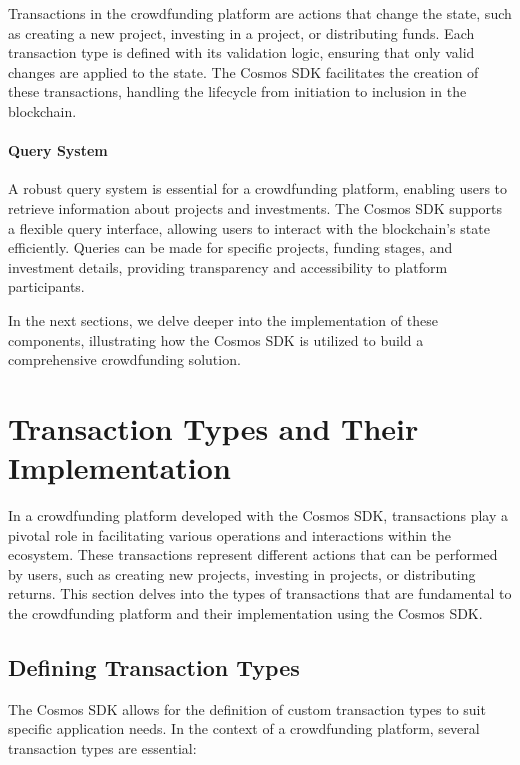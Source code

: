 Transactions in the crowdfunding platform are actions that change the state, such as creating a new project, investing in a project, or distributing funds. Each transaction type is defined with its validation logic, ensuring that only valid changes are applied to the state. The Cosmos SDK facilitates the creation of these transactions, handling the lifecycle from initiation to inclusion in the blockchain.

\paragraph{Query System}

A robust query system is essential for a crowdfunding platform, enabling users to retrieve information about projects and investments. The Cosmos SDK supports a flexible query interface, allowing users to interact with the blockchain's state efficiently. Queries can be made for specific projects, funding stages, and investment details, providing transparency and accessibility to platform participants.

In the next sections, we delve deeper into the implementation of these components, illustrating how the Cosmos SDK is utilized to build a comprehensive crowdfunding solution.

\section{Transaction Types and Their Implementation}

In a crowdfunding platform developed with the Cosmos SDK, transactions play a pivotal role in facilitating various operations and interactions within the ecosystem. These transactions represent different actions that can be performed by users, such as creating new projects, investing in projects, or distributing returns. This section delves into the types of transactions that are fundamental to the crowdfunding platform and their implementation using the Cosmos SDK.

\subsection{Defining Transaction Types}

The Cosmos SDK allows for the definition of custom transaction types to suit specific application needs. In the context of a crowdfunding platform, several transaction types are essential:

